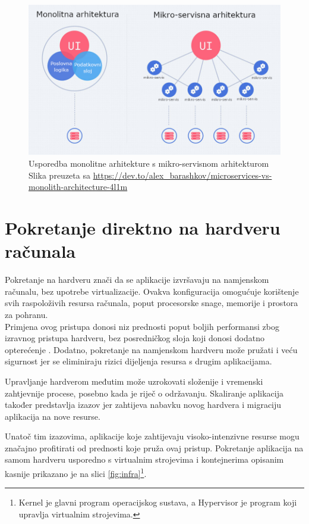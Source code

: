 \documentclass[times, utf8, diplomski]{fer}
\begin{document}
\begin{figure}[htb]
	\centering
	\includegraphics[width=15cm]{images/microservice.png}
	\caption[Usporedba monolitne arhitekture s mikro-servisnom arhitekturom]{Usporedba monolitne arhitekture s mikro-servisnom arhitekturom\\Slika preuzeta sa \url{https://dev.to/alex_barashkov/microservices-vs-monolith-architecture-4l1m}}
	\label{fig:microservice}
\end{figure}


\section{Pokretanje direktno na hardveru računala}

Pokretanje na hardveru  znači da se aplikacije izvršavaju na namjenskom računalu, bez upotrebe virtualizacije. Ovakva konfiguracija omogućuje korištenje svih raspoloživih resursa računala, poput procesorske snage, memorije i prostora za pohranu. \\

Primjena ovog pristupa donosi niz prednosti poput boljih performansi zbog izravnog pristupa hardveru, bez posredničkog sloja koji donosi dodatno opterećenje . Dodatno, pokretanje na namjenskom hardveru može pružati i veću sigurnost jer se eliminiraju rizici dijeljenja resursa s drugim aplikacijama.

Upravljanje hardverom međutim može uzrokovati složenije i vremenski zahtjevnije procese, posebno kada je riječ o održavanju. Skaliranje aplikacija također predstavlja izazov jer zahtijeva nabavku novog hardvera i migraciju aplikacija na nove resurse.

Unatoč tim izazovima, aplikacije koje zahtijevaju visoko-intenzivne resurse mogu značajno profitirati od prednosti koje pruža ovaj pristup. Pokretanje aplikacija na samom hardveru usporedno s virtualnim strojevima i kontejnerima opisanim kasnije prikazano je na slici \ref{fig:infra}\footnote{Kernel je glavni program operacijskog sustava, a Hypervisor je program koji upravlja virtualnim strojevima.}.
\end{document}
